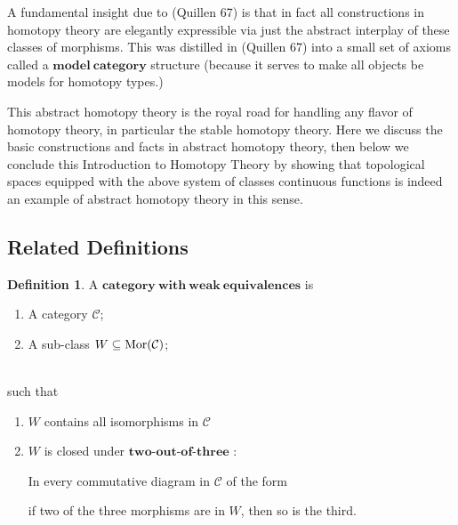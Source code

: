 \documentclass[a4paper]{article}
\theoremstyle{plain}
\theoremstyle{definition}
\newtheorem{defn}{Definition}[section]
\theoremstyle{remark}
\newcommand{\mc}[1]{\mathcal{#1}}
\newcommand{\mbf}[1]{\mathbf{#1}}
\newcommand{\mcC}{\mc C}
\DeclareMathOperator{\Mor}{\rm{Mor}}
\begin{document}
    \par A fundamental insight due to (Quillen 67) is that in fact
    all constructions in homotopy theory are elegantly expressible
    via just the abstract interplay of these classes of morphisms.
    This was distilled in (Quillen 67) into
    a small set of axioms called a $\mbf{model\ category}$ structure
    (because it serves to make all objects be models for homotopy types.)

    \par This abstract homotopy theory is the royal road for
    handling any flavor of homotopy theory,
    in particular the stable homotopy theory.
    Here we discuss the basic constructions and facts in abstract homotopy theory,
    then below we conclude this Introduction to Homotopy Theory by
    showing that topological spaces equipped with the above system of
    classes continuous functions is indeed an example of
    abstract homotopy theory in this sense.


    \subsection{Related Definitions}

    \begin{defn}
        A $\mbf{category\ with\ weak\ equivalences}$ is
        \begin{enumerate}
            \item A category $\mcC$;
            \item A sub-class $W \subseteq \Mor(\mcC)$;
        \end{enumerate}
        \ \\
        such that
        \begin{enumerate}
            \item $W$ contains all isomorphisms in $\mcC$
            \item $W$ is closed under $\mbf{two\text{-}out\text{-} of\text{-} three}$ :
            \par In every commutative diagram in $\mcC$ of the form

            if two of the three morphisms are in $W$, then so is the third.

        \end{enumerate}

    \end{defn}
\end{document}
